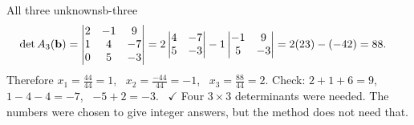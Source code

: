 \documentclass[11pt]{article}
\begin{document}
\begin{exmp}{All three unknowns}{b-three}
\begin{align*}
\det A_3(\mathbf{b})&=\begin{vmatrix}2&-1&9\\1&4&-7\\0&5&-3\end{vmatrix}=2\begin{vmatrix}4&-7\\5&-3\end{vmatrix}-1\begin{vmatrix}-1&9\\5&-3\end{vmatrix}=2(23)-(-42)=88.
\end{align*}
Therefore $x_1=\frac{44}{44}=1$, \ $x_2=\frac{-44}{44}=-1$, \ $x_3=\frac{88}{44}=2$. Check: $2+1+6=9$, \ $1-4-4=-7$, \ $-5+2=-3$. \ $\checkmark$ Four $3\times3$ determinants were needed. The numbers were chosen to give integer answers, but the method does not need that.
\end{exmp}
\end{document}
